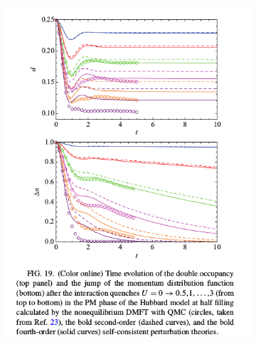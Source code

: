 \begin{figure}[H]
\begin{subfigure}{.5\textwidth}
 \includegraphics[width=1.\linewidth]{bench_marking/HUB_para_quench_literature_small_U.png}
  \caption{}
\end{subfigure}%
\begin{subfigure}{.5\textwidth}

\end{subfigure}
\end{figure}
